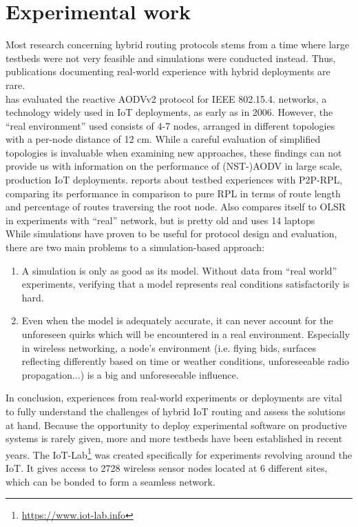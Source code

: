 \documentclass[a4paper,10pt]{scrartcl}
\begin{document}
\section{Experimental work}
\label{sec:experiments}
Most research concerning hybrid routing protocols stems from a time where large testbeds were not very feasible and simulations were conducted instead.  Thus, publications documenting real-world experience with hybrid deployments are rare.\\

\cite{gomez_NSTAODV_eval} has evaluated the reactive AODVv2 protocol for IEEE 802.15.4. networks, a technology widely used in IoT deployments, as early as in 2006. However, the ``real environment'' used consists of 4-7 nodes, arranged in different topologies with a per-node distance of 12 cm. While a careful evaluation of simplified topologies is invaluable when examining new approaches, these findings can not provide us with information on the performance of (NST-)AODV in large scale, production IoT deployments.
\cite{baccelli_p2p_prl} reports about testbed experiences with P2P-RPL, comparing its performance in comparison to pure RPL in terms of route length and percentage of routes traversing the root node.
\cite{WARP} Also compares itself to OLSR in experiments with ``real'' network, but is pretty old and uses 14 laptops \\

While simulations have proven to be useful for protocol design and evaluation, there are two main problems to a simulation-based approach: 
\begin{enumerate}
\item A simulation is only as good as its model. Without data from ``real world'' experiments, verifying that a model represents real conditions satisfactorily is hard.
\item Even when the model is adequately accurate, it can never account for the unforeseen quirks which will be encountered in a real environment. Especially in wireless networking, a node's environment (i.e. flying bids, surfaces reflecting differently based on time or weather conditions, unforeseeable radio propagation...) is a big and unforeseeable influence.
\end{enumerate}
In conclusion, experiences from real-world experiments or deployments are vital to fully understand the challenges of hybrid IoT routing and assess the solutions at hand. Because the opportunity to deploy experimental software on productive systems is rarely given, more and more testbeds have been established in recent years. 
The IoT-Lab\footnote{\url{https://www.iot-lab.info}} was created specifically for experiments revolving around the IoT. It gives access to 2728 wireless sensor nodes located at 6 different sites, which can be bonded to form a seamless network.
\end{document}
